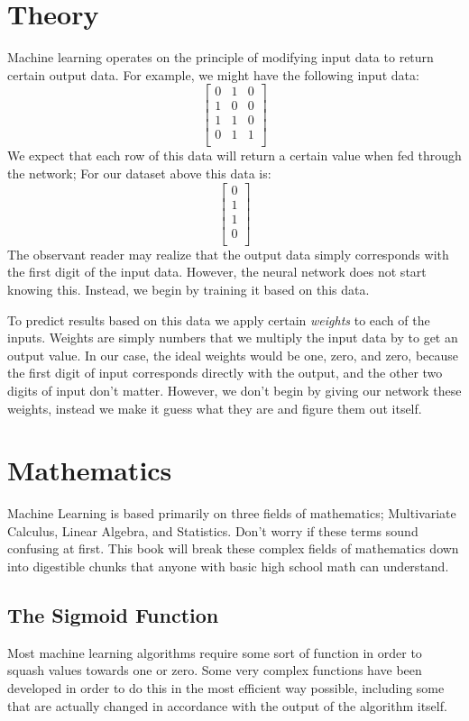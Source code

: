 \documentclass{memoir}
\begin{document}
\section{Theory}
Machine learning operates on the principle of modifying input data to return certain output data. For example, we might have the following input data:
\[
	\begin{bmatrix}
		0 & 1 & 0 \\
		1 & 0 & 0 \\
		1 & 1 & 0 \\
		0 & 1 & 1 \\
	\end{bmatrix}
\]
We expect that each row of this data will return a certain value when fed through the network; For our dataset above this data is:
\[
	\begin{bmatrix}
		0 \\
		1 \\
		1 \\
		0 \\
	\end{bmatrix}
\]
The observant reader may realize that the output data simply corresponds with the first digit of the input data. However, the neural network does not start knowing this. Instead, we begin by training it based on this data.

To predict results based on this data we apply certain \emph{weights} to each of the inputs. Weights are simply numbers that we multiply the input data by to get an output value. In our case, the ideal weights would be one, zero, and zero, because the first digit of input corresponds directly with the output, and the other two digits of input don't matter. However, we don't begin by giving our network these weights, instead we make it guess what they are and figure them out itself.

\section{Mathematics}
Machine Learning is based primarily on three fields of mathematics; Multivariate Calculus, Linear Algebra, and Statistics. Don't worry if these terms sound confusing at first. This book will break these complex fields of mathematics down into digestible chunks that anyone with basic high school math can understand.

\subsection{The Sigmoid Function}
Most machine learning algorithms require some sort of function in order to squash values towards one or zero. Some very complex functions have been developed in order to do this in the most efficient way possible, including some that are actually changed in accordance with the output of the algorithm itself.
\end{document}

